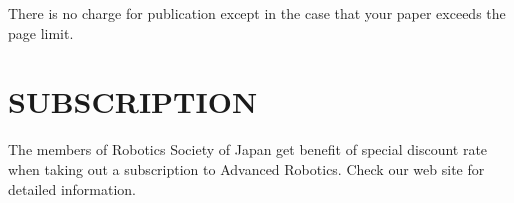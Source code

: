 \documentclass{arsubmit}
\begin{document}
There is no charge for publication except in the case that your paper
exceeds the page limit.

\section{SUBSCRIPTION}
\label{sec:Subscription}

The members of Robotics Society of Japan get benefit of special discount
rate when taking out a subscription to Advanced Robotics.  
Check our web site for detailed information.
\end{document}

